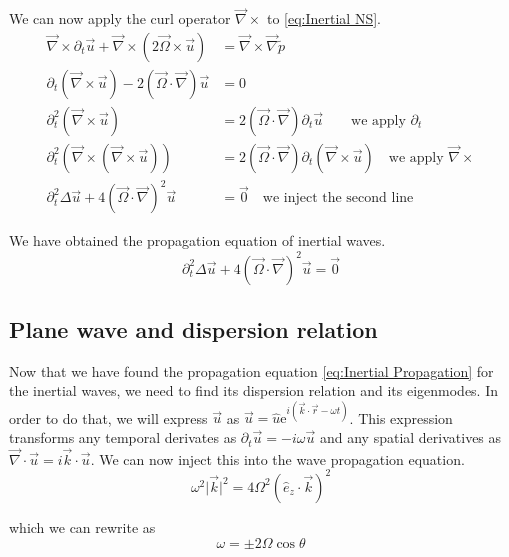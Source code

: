 \quad

We can now apply the curl operator $\vec{\nabla} \times$ to \cref{eq:Inertial NS}.
\begin{align*}
	\vec{\nabla} \times \partial_t \vec{u} + \vec{\nabla} \times \left( 2 \vec{\Omega} \times \vec{u} \right) & = \vec{\nabla} \times \vec{\nabla} \tilde{p}	\\
	\partial_t \left( \vec{\nabla} \times \vec{u} \right) - 2 \left( \vec{\Omega} \cdot \vec{\nabla} \right) \vec{u} & = 0 \\
	\partial_t^2 \left( \vec{\nabla} \times \vec{u} \right) & = 2 \left( \vec{\Omega} \cdot \vec{\nabla} \right) \partial_t \vec{u} \qquad \text{we apply $\partial_t$} \\
	\partial_t^2 \left( \vec{\nabla} \times \left( \vec{\nabla} \times \vec{u} \right) \right) & = 2 \left( \vec{\Omega} \cdot \vec{\nabla} \right) \partial_t \left( \vec{\nabla} \times \vec{u} \right) \quad \text{we apply $\vec{\nabla} \times$} \\
	\partial_t^2 \Delta \vec{u} + 4  \left( \vec{\Omega} \cdot \vec{\nabla} \right)^2 \vec{u} & = \vec{0} \quad \text{we inject the second line}
\end{align*}

We have obtained the propagation equation of inertial waves. 
\begin{equation}
	\partial_t^2 \Delta \vec{u} + 4  \left( \vec{\Omega} \cdot \vec{\nabla} \right)^2 \vec{u} = \vec{0}
	\label{eq:Inertial Propagation}
\end{equation}
\subsection{Plane wave and dispersion relation}
\label{sec:Inertial.2}
Now that we have found the propagation equation \cref{eq:Inertial Propagation} for the inertial waves, we need to find its dispersion relation and its eigenmodes. In order to do that, we will express $\vec{u}$ as $\vec{u} = \hat{u} \mathrm{e}^{i \left( \vec{k} \cdot \vec{r} - \omega t	 \right)}$. This expression transforms any temporal derivates as $\partial_t \vec{u} = -i \omega \vec{u}$ and any spatial derivatives as $\vec{\nabla} \cdot \vec{u} = i \vec{k} \cdot \vec{u}$. We can now inject this into the wave propagation equation.
\begin{equation}
	\omega^2 \lvert\vec{k}\rvert^2 = 4 \Omega^2 \left( \hat{e}_z \cdot \vec{k} \right)^2 
\end{equation}

which we can rewrite as 
\begin{equation}
	\omega = \pm 2 \Omega \cos{\theta}
\end{equation}


